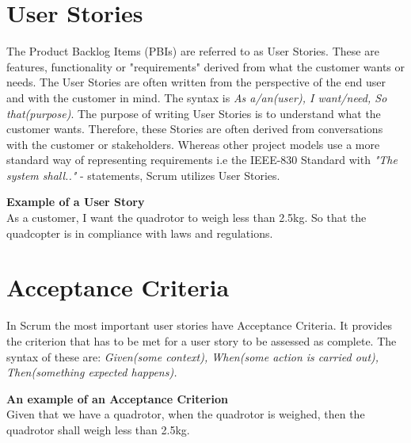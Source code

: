 \section{User Stories}
The Product Backlog Items (PBIs) are referred to as User Stories. These are features, functionality or "requirements" derived from what the customer wants or needs. The User Stories are often written from the perspective of the end user and with the customer in mind. The syntax is \textit{As a/an(user), I want/need, So that(purpose)}. The purpose of writing User Stories is to understand what the customer wants. Therefore, these Stories are often derived from conversations with the customer or stakeholders. Whereas other project models use a more standard way of representing requirements i.e the IEEE-830 Standard with \textit{"The system shall.."} - statements, Scrum utilizes User Stories. \bigskip

\textbf{Example of a User Story} \\
As a customer, I want the quadrotor to weigh less than 2.5kg. So that the quadcopter is in compliance with laws and regulations. 

\clearpage

\section{Acceptance Criteria}
In Scrum the most important user stories have Acceptance Criteria. It provides the criterion that has to be met for a user story to be assessed as complete.  
The syntax of these are: \textit{Given(some context), When(some action is carried out), Then(something expected happens).} \bigskip 

\textbf{An example of an Acceptance Criterion} \\
Given that we have a quadrotor, when the quadrotor is weighed, then the quadrotor shall weigh less than 2.5kg.





 